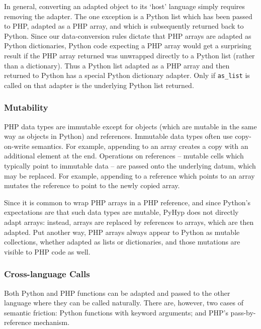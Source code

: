\documentclass[a4paper,UKenglish]{lipics-v2016}
\newcommand{\ourvm}{PyHyp\xspace}
\begin{document}
In general, converting an adapted object to its `host' language simply requires
removing the adapter. The one exception is a Python list which has been passed
to PHP, adapted as a PHP array, and which is subsequently returned back to Python.
Since our data-conversion rules dictate that
PHP arrays are adapted as Python dictionaries, Python code expecting a PHP
array would get a surprising result if the PHP array returned was unwrapped
directly to a Python list (rather than a dictionary). Thus a Python list adapted as a PHP array and then
returned to Python has a special Python dictionary adapter. Only if \texttt{as\_list}
is called on that adapter is the underlying Python list returned.


\subsubsection{Mutability}

PHP data types are immutable except for objects (which are mutable in
the same way as objects in Python) and references. Immutable data types often
use copy-on-write semantics. For example, appending to an array
creates a copy with an additional element at the end.
Operations on references -- mutable cells which typically point to immutable
data -- are passed onto the underlying datum,
which may be replaced. For example, appending to a reference which
points to an array mutates the reference to point to the newly copied array.

\label{sec:arrayrefs}
Since it is common to wrap PHP arrays in a PHP reference, and since Python's
expectations are that such data types are mutable, \ourvm does not directly
adapt arrays: instead, arrays are replaced by references to arrays, which
are then adapted. Put another way, PHP arrays
always appear to Python as mutable collections, whether adapted as lists or
dictionaries, and those mutations are visible to PHP code as well.


\subsubsection{Cross-language Calls}
\label{sec:args}

Both Python and PHP functions can be adapted and passed to the other language where they can be
called naturally. There are, however, two cases of semantic friction: Python functions with keyword
arguments; and PHP's pass-by-reference mechanism.
\end{document}
